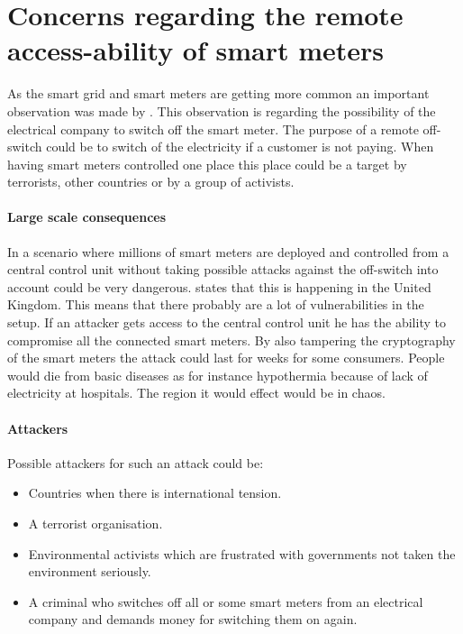 
\section{Concerns regarding the remote access-ability of smart meters}\label{off_switch}
As the smart grid and smart meters are getting more common an important observation was made by \citet{offswitch}.
This observation is regarding the possibility of the electrical company to switch off the smart meter.
The purpose of a remote off-switch could be to switch of the electricity if a customer is not paying.
When having smart meters controlled one place this place could be a target by terrorists, other countries or by a group of activists. 

\paragraph{Large scale consequences}
In a scenario where millions of smart meters are deployed and controlled from a central control unit without taking possible attacks against the off-switch into account could be very dangerous.
\citet{offswitch} states that this is happening in the United Kingdom.
This means that there probably are a lot of vulnerabilities in the setup.
If an attacker gets access to the central control unit he has the ability to compromise all the connected smart meters.
By also tampering the cryptography of the smart meters the attack could last for weeks for some consumers.
People would die from basic diseases as for instance hypothermia because of lack of electricity at hospitals.
The region it would effect would be in chaos.

\paragraph{Attackers}
Possible attackers for such an attack could be:
\begin{itemize}
\item Countries when there is international tension.
\item A terrorist organisation.
\item Environmental activists which are frustrated with governments not taken the environment seriously.
\item A criminal who switches off all or some smart meters from an electrical company and demands money for switching them on again.
\end{itemize}
